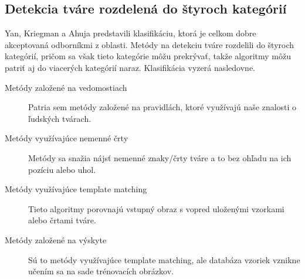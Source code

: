 \subsection{Detekcia tváre rozdelená do štyroch kategórií}
Yan, Kriegman a Ahuja predstavili klasifikáciu, ktorá je celkom dobre akceptovaná odborníkmi z oblasti.
Metódy na detekciu tváre rozdelili do štyroch kategórií, pričom sa však tieto kategórie môžu prekrývať, takže algoritmy môžu patriť aj do viacerých kategórií naraz.
Klasifikácia vyzerá nasledovne.
\begin{description}
  \item[Metódy založené na vedomostiach] 
  Patria sem metódy založené na pravidlách, ktoré využívajú naše znalosti o ľudských tvárach.
  \item[Metódy využívajúce nemenné črty]
  Metódy sa snažia nájsť nemenné znaky/črty tváre a to bez ohľadu na ich pozíciu alebo uhol.
  \item[Metódy využívajúce template matching]
  Tieto algoritmy porovnajú vstupný obraz s vopred uloženými vzorkami alebo črtami tváre.
  \item[Metódy založené na výskyte]
  Sú to metódy využívajúce template matching, ale databáza vzoriek vznikne učením sa na sade trénovacích obrázkov.
\end{description}


